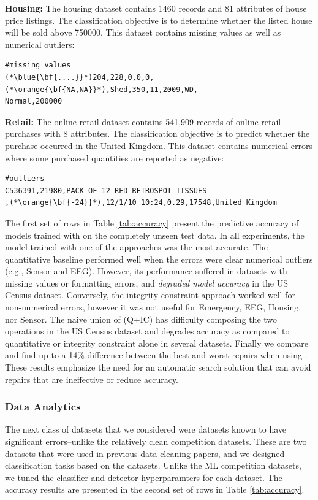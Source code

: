 \vspace{0.5em}\noindent\textbf{Housing: } The housing dataset contains 1460 records and 81 attributes of house price listings. The classification objective is to determine whether the listed house will be sold above 750000. 
This dataset contains missing values as well as numerical outliers:
\begin{lstlisting}
#missing values
(*\blue{\bf{....}}*)204,228,0,0,0,(*\orange{\bf{NA,NA}}*),Shed,350,11,2009,WD,
Normal,200000
\end{lstlisting}

\vspace{0.5em}\noindent\textbf{Retail: } The online retail dataset contains 541,909 records of online retail purchases with 8 attributes. The classification objective is to predict whether the purchase occurred in the United Kingdom.
This dataset contains numerical errors where some purchased quantities are reported as negative:
\begin{lstlisting}
#outliers
C536391,21980,PACK OF 12 RED RETROSPOT TISSUES
,(*\orange{\bf{-24}}*),12/1/10 10:24,0.29,17548,United Kingdom
\end{lstlisting}

\vspace{1em}
The first set of rows in Table \ref{tab:accuracy} present the predictive accuracy of models trained with \sys on the completely unseen test data.  In all experiments, the model trained with one of the \sys  approaches was the most accurate.
The quantitative baseline performed well when the errors were clear numerical outliers (e.g., Sensor and  EEG).  However, its performance suffered in datasets with missing values or formatting errors, and {\it degraded model accuracy} in the US Census dataset.
Conversely, the integrity constraint approach worked well for non-numerical errors, however it was not useful for Emergency, EEG, Housing, nor Sensor.
The naive union of (Q+IC) has difficulty composing the two operations in the US Census dataset and degrades accuracy as compared to quantitative or integrity constraint alone in several datasets.  Finally we compare and find up to a 14\% difference between the best and worst repairs when using \sys.  These results emphasize the need for an automatic search solution that can avoid repairs that are ineffective or reduce accuracy.



\subsubsection{Data Analytics}
The next class of datasets that we considered were datasets known to have significant errors--unlike the relatively clean competition datasets. These are two datasets that were used in previous data cleaning papers, and we designed classification tasks based on the datasets.
Unlike the ML competition datasets, we tuned the classifier and detector hyperparamters for each dataset. 
The accuracy results are presented in the second set of rows in Table \ref{tab:accuracy}.

